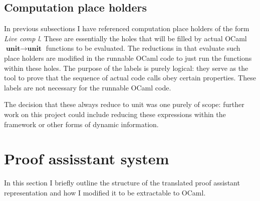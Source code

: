 \documentclass[12pt,twoside,notitlepage]{report}
\begin{document}
\subsection{Computation place holders}
In previous subsections I have referenced computation place holders of the form \textit{Live comp l}. These are essentially the holes that will be filled by actual OCaml $ \textbf{unit} \rightarrow \textbf{unit} $ functions to be evaluated. The reductions in  that evaluate such place holders are modified in the runnable OCaml code to just run the functions within these holes. The purpose of the labels is purely logical: they serve as the tool to prove that the sequence of actual code calls obey certain properties. These labels are not necessary for the runnable OCaml code.

The decision that these always reduce to unit was one purely of scope: further work on this project could include reducing these expressions within the framework or other forms of dynamic information. \clearpage
\section{Proof assisstant system}
In this section I briefly outline the structure of the translated proof assistant representation and how I modified it to be extractable to OCaml. 
\end{document}
